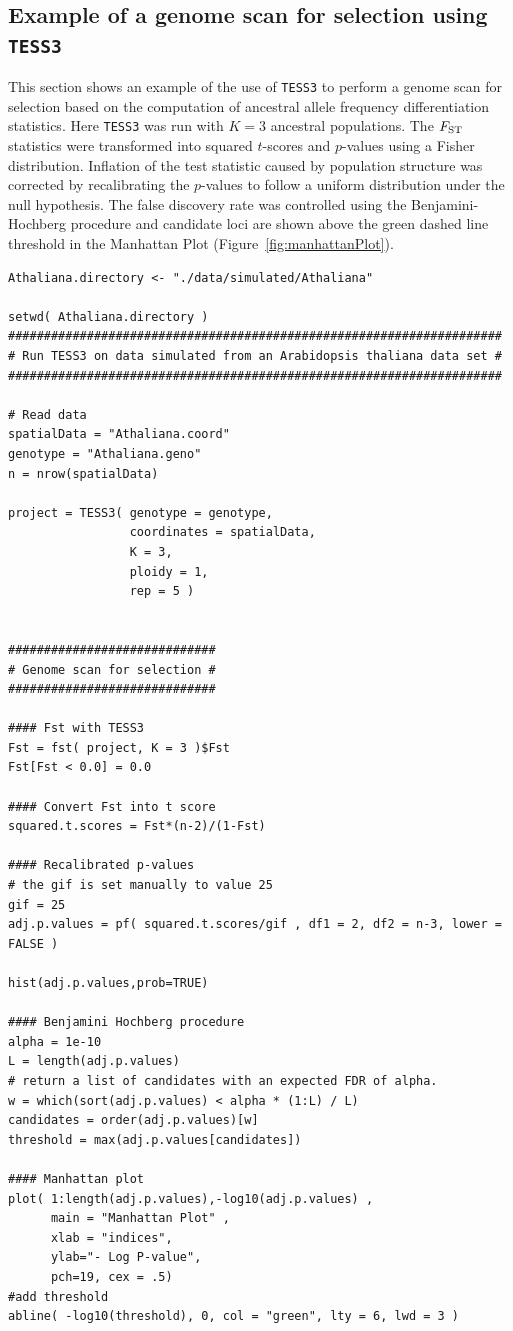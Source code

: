 \documentclass[10pt,a4paper]{article}
\begin{document}
\subsection{Example of a genome scan for selection using {\tt TESS3}}\label{sec:sel}
This section shows an example of the use of {\tt TESS3} to perform a genome scan for selection based on the computation of ancestral allele frequency differentiation statistics. Here {\tt TESS3} was run with $K = 3$ ancestral populations. The $F_{\rm ST}$ statistics were transformed into squared $t$-scores and $p$-values using a Fisher distribution. Inflation of the test statistic caused by population structure was corrected by recalibrating the $p$-values to follow a uniform distribution under the null hypothesis. The false discovery rate was controlled using the Benjamini-Hochberg procedure and candidate loci are shown above the green dashed line threshold in the Manhattan Plot (Figure~\ref{fig:manhattanPlot}).


\newpage

\begin{Verbatim}[frame=single]
Athaliana.directory <- "./data/simulated/Athaliana"

setwd( Athaliana.directory )
#####################################################################
# Run TESS3 on data simulated from an Arabidopsis thaliana data set #
#####################################################################

# Read data
spatialData = "Athaliana.coord"
genotype = "Athaliana.geno"
n = nrow(spatialData)

project = TESS3( genotype = genotype, 
                 coordinates = spatialData, 
                 K = 3, 
                 ploidy = 1, 
                 rep = 5 )


#############################
# Genome scan for selection #
#############################

#### Fst with TESS3 
Fst = fst( project, K = 3 )$Fst
Fst[Fst < 0.0] = 0.0

#### Convert Fst into t score
squared.t.scores = Fst*(n-2)/(1-Fst)

#### Recalibrated p-values
# the gif is set manually to value 25
gif = 25
adj.p.values = pf( squared.t.scores/gif , df1 = 2, df2 = n-3, lower = FALSE )

hist(adj.p.values,prob=TRUE)

#### Benjamini Hochberg procedure
alpha = 1e-10
L = length(adj.p.values)
# return a list of candidates with an expected FDR of alpha.
w = which(sort(adj.p.values) < alpha * (1:L) / L)
candidates = order(adj.p.values)[w]
threshold = max(adj.p.values[candidates])

#### Manhattan plot 
plot( 1:length(adj.p.values),-log10(adj.p.values) , 
      main = "Manhattan Plot" , 
      xlab = "indices", 
      ylab="- Log P-value", 
      pch=19, cex = .5) 
#add threshold
abline( -log10(threshold), 0, col = "green", lty = 6, lwd = 3 )
\end{Verbatim}
\end{document}
